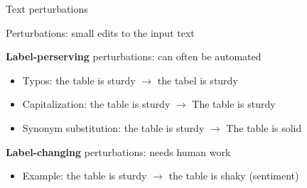 \documentclass[usenames,dvipsnames,notes,11pt,aspectratio=169,hyperref={colorlinks=true, linkcolor=blue}]{beamer}
\begin{document}
\begin{frame}
    {Text perturbations}

    Perturbations: small edits to the input text

    \textbf{Label-perserving} perturbations: can often be automated\\
    \begin{itemize}
        \item Typos: the table is sturdy $\rightarrow$ the tabel is sturdy
        \item Capitalization: the table is sturdy $\rightarrow$ The table is sturdy
        \item Synonym substitution: the table is sturdy $\rightarrow$ The table is solid 
    \end{itemize}
    \pause

    \textbf{Label-changing} perturbations: needs human work\\
    \begin{itemize}
        \item Example:   the table is sturdy $\rightarrow$ the table is shaky (sentiment) 
    \end{itemize}
\end{frame}
\end{document}
